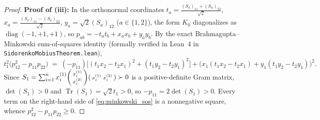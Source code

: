 \documentclass[11pt,a4paper]{article}
\theoremstyle{plain}
\theoremstyle{definition}
\theoremstyle{remark}
\DeclareMathOperator{\Tr}{Tr}
\DeclareMathOperator{\diag}{diag}
\begin{document}
\begin{proof}
\textbf{Proof of (iii):} In the orthonormal coordinates $t_a = \frac{(S_a)_{11} + (S_a)_{22}}{\sqrt{2}}$, $x_a = \frac{(S_a)_{11} - (S_a)_{22}}{\sqrt{2}}$, $y_a = \sqrt{2}(S_a)_{12}$ ($a \in \{1,2\}$), the form $K_0$ diagonalizes as $\diag(-1, +1, +1)$, so $p_{ab} = -t_a t_b + x_a x_b + y_a y_b$. By the exact Brahmagupta--Minkowski sum-of-squares identity (formally verified in Lean~4 in \texttt{SidorenkoMobiusTheorem.lean}),
\begin{equation}\label{eq:minkowski_sos}
  t_1^2\big(p_{12}^2 - p_{11}p_{22}\big) \;=\; (-p_{11})\Big[(t_1 x_2 - t_2 x_1)^2 + (t_1 y_2 - t_2 y_1)^2\Big] + \big(x_1(t_1 x_2 - t_2 x_1) + y_1(t_1 y_2 - t_2 y_1)\big)^2.
\end{equation}
Since $S_1 = \sum_{i=1}^n x_i^{(1)} \begin{psmallmatrix} x_i^{(1)} \\ x_i^{(2)} \end{psmallmatrix} \begin{psmallmatrix} x_i^{(1)} & x_i^{(2)} \end{psmallmatrix} \succ 0$ is a positive-definite Gram matrix, $\det(S_1) > 0$ and $\Tr(S_1) = \sqrt{2}t_1 > 0$, so $-p_{11} = 2\det(S_1) > 0$. Every term on the right-hand side of \eqref{eq:minkowski_sos} is a nonnegative square, whence $p_{12}^2 - p_{11}p_{22} \ge 0$.


\end{proof}
\end{document}
